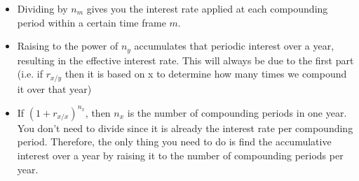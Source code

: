 \begin{intuition}
    \begin{itemize}
        \item Dividing by $n_m$ gives you the interest rate applied at each compounding period within a certain time frame $m$.
        \item Raising to the power of $n_y$ accumulates that periodic interest over a year, resulting in the effective interest rate. This will always be due to the first part (i.e. if $r_{x/y}$ then it is based on x to determine how many times we compound it over that year)
        \item If $\left(1 + r_{x/x}\right)^{n_x}$, then $n_x$ is the number of compounding periods in one year. You don't need to divide since it is already the interest rate per compounding period. Therefore, the only thing you need to do is find the accumulative interest over a year by raising it to the number of compounding periods per year.
    \end{itemize}
\end{intuition}
